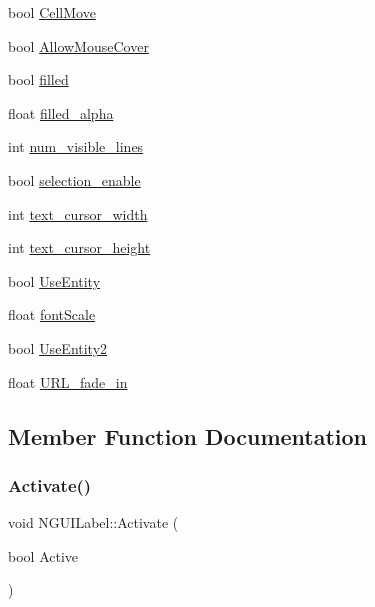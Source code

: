 \begin{DoxyCompactItemize}
\item 
bool \hyperlink{class_n_g_u_i_label_ac677b3402a40f11b98d5618a2a4d759c}{Cell\+Move}
\item 
bool \hyperlink{class_n_g_u_i_label_a896b42588636ae937e5a0ac65faf958e}{Allow\+Mouse\+Cover}
\item 
bool \hyperlink{class_n_g_u_i_label_a0349df965b20fc97d2d22e346beb9a9c}{filled}
\item 
float \hyperlink{class_n_g_u_i_label_adfb264c16b82e766008890fd344c67e4}{filled\+\_\+alpha}
\item 
int \hyperlink{class_n_g_u_i_label_ae08fde6a71a4015f873b2578e555a334}{num\+\_\+visible\+\_\+lines}
\item 
bool \hyperlink{class_n_g_u_i_label_a1bfce7b286cab49c319cb099d78bb733}{selection\+\_\+enable}
\item 
int \hyperlink{class_n_g_u_i_label_a53ebe07ac0e9fdd302d70d2030dfc357}{text\+\_\+cursor\+\_\+width}
\item 
int \hyperlink{class_n_g_u_i_label_a917fbd5da71316f165de53901bb50e1f}{text\+\_\+cursor\+\_\+height}
\item 
bool \hyperlink{class_n_g_u_i_label_a1c8db06a5e4df9ab3d6e392b252fa5bb}{Use\+Entity}
\item 
float \hyperlink{class_n_g_u_i_label_a61a74ff519ffe248db800fa66d61d098}{font\+Scale}
\item 
bool \hyperlink{class_n_g_u_i_label_aeef7803b53c0b0675210ada18c47dc0c}{Use\+Entity2}
\item 
float \hyperlink{class_n_g_u_i_label_a575ec5c36bf08d7d428b8ed59254d997}{U\+R\+L\+\_\+fade\+\_\+in}
\end{DoxyCompactItemize}


\subsection{Member Function Documentation}
\hypertarget{class_n_g_u_i_label_a8f090e250ca64f7a6c6af38b79fd9417}{}\label{class_n_g_u_i_label_a8f090e250ca64f7a6c6af38b79fd9417} 
\subsubsection{\texorpdfstring{Activate()}{Activate()}}
{\footnotesize\ttfamily void N\+G\+U\+I\+Label\+::\+Activate (\begin{DoxyParamCaption}\item[{bool}]{Active }\end{DoxyParamCaption})}

